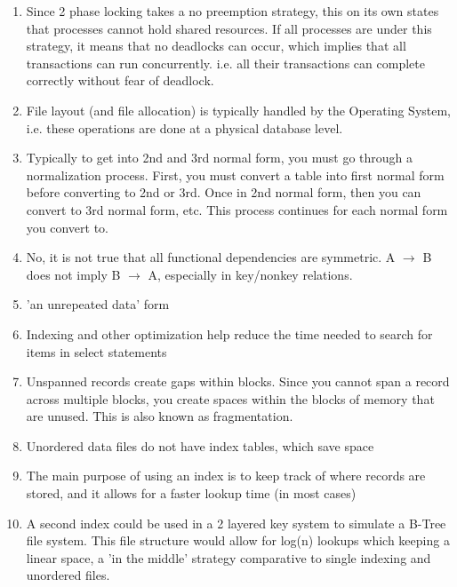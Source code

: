 \documentclass[12pt]{article}
\begin{document}
\begin{enumerate}
	\item Since 2 phase locking takes a no preemption strategy, this on its own states that processes cannot hold shared resources. If all processes are under this strategy,
it means that no deadlocks can occur, which implies that all transactions can run concurrently. i.e. all their transactions can complete correctly without fear of deadlock.
	
	\item File layout (and file allocation) is typically handled by the Operating System, i.e. these operations are done at a physical database level.
	
	\item Typically to get into 2nd and 3rd normal form, you must go through a normalization process. First, you must convert a table into first normal
form before converting to 2nd or 3rd. Once in 2nd normal form, then you can convert to 3rd normal form, etc. This process continues for each normal
form you convert to.
	
	\item No, it is not true that all functional dependencies are symmetric.  A $\rightarrow$ B does not imply B $\rightarrow$ A, especially in key/nonkey relations.
	
	\item 'an unrepeated data' form
	
	\item Indexing and other optimization help reduce the time needed to search for items in select statements
	
	\item Unspanned records create gaps within blocks. Since you cannot span a record across multiple blocks, you create spaces within the blocks of memory that are unused. This is also known as fragmentation.
	
	\item Unordered data files do not have index tables, which save space
	
	\item The main purpose of using an index is to keep track of where records are stored, and it allows for a faster lookup time (in most cases)
	
	\item A second index could be used in a 2 layered key system to simulate a B-Tree file system. This file structure would allow for log(n) lookups which keeping a linear space, a 'in the middle' strategy comparative to single indexing and unordered files.
	

\end{enumerate}
\end{document}
